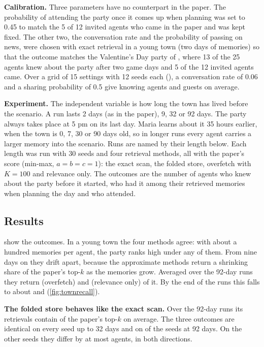 \textbf{Calibration.} Three parameters have no counterpart in the paper. The probability of attending the party once it comes up when planning was set to 0.45 to match the 5 of 12 invited agents who came in the paper and was kept fixed. The other two, the conversation rate and the probability of passing on news, were chosen with exact retrieval in a young town (two days of memories) so that the outcome matches the Valentine's Day party of \citet{park2023generative}, where 13 of the 25 agents knew about the party after two game days and 5 of the 12 invited agents came. Over a grid of 15 settings with 12 seeds each (), a conversation rate of 0.06 and a sharing probability of 0.5 give \CalKnew{} knowing agents and \CalAttended{} guests on average.

\textbf{Experiment.} The independent variable is how long the town has lived before the scenario. A run lasts 2 days (as in the paper), 9, 32 or 92 days. The party always takes place at 5 pm on its last day. Maria learns about it 35 hours earlier, when the town is 0, 7, 30 or 90 days old, so in longer runs every agent carries a larger memory into the scenario. Runs are named by their length below. Each length was run with 30 seeds and four retrieval methods, all with the paper's score (min-max, $a=b=c=1$): the exact scan, the folded store, overfetch with $K=100$ and relevance only. The outcomes are the number of agents who knew about the party before it started, who had it among their retrieved memories when planning the day and who attended.

\subsection{Results}

 show the outcomes. In a young town the four methods agree: with about a hundred memories per agent, the party ranks high under any of them. From nine days on they drift apart, because the approximate methods return a shrinking share of the paper's top-$k$ as the memories grow. Averaged over the 92-day runs they return \TNinetyReRecall{} (overfetch) and \TNinetyRelRecall{} (relevance only) of it. By the end of the runs this falls to about \TNinetyReRecallEnd{} and \TNinetyRelRecallEnd{} (\cref{fig:townrecall}).

\textbf{The folded store behaves like the exact scan.} Over the 92-day runs its retrievals contain \TNinetyFoRecall{} of the paper's top-$k$ on average. The three outcomes are identical on every seed up to 32 days and on \TNinetyFoSame{} of the \TNinetySeeds{} seeds at 92 days. On the other seeds they differ by at most \TNinetyFoMaxDiff{} agents, in both directions.

